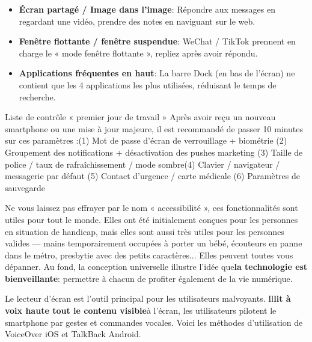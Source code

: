 \begin{itemize}
  \item \textbf{Écran partagé / Image dans l'image}: Répondre aux messages en regardant une vidéo, prendre des notes en naviguant sur le web.
  \item \textbf{Fenêtre flottante / fenêtre suspendue}: WeChat / TikTok prennent en charge le « mode fenêtre flottante », repliez après avoir répondu.
  \item \textbf{Applications fréquentes en haut}: La barre Dock (en bas de l'écran) ne contient que les 4 applications les plus utilisées, réduisant le temps de recherche.
\end{itemize}

\begin{tcbinfo}{Liste de contrôle « premier jour de travail »}
Après avoir reçu un nouveau smartphone ou une mise à jour majeure, il est recommandé de passer 10 minutes sur ces paramètres :\newline (1) Mot de passe d'écran de verrouillage + biométrie (2) Groupement des notifications + désactivation des pushes marketing (3) Taille de police / taux de rafraîchissement / mode sombre\newline (4) Clavier / navigateur / messagerie par défaut (5) Contact d'urgence / carte médicale (6) Paramètres de sauvegarde

\end{tcbinfo}


Ne vous laissez pas effrayer par le nom « accessibilité », ces fonctionnalités sont utiles pour tout le monde. Elles ont été initialement conçues pour les personnes en situation de handicap, mais elles sont aussi très utiles pour les personnes valides — mains temporairement occupées à porter un bébé, écouteurs en panne dans le métro, presbytie avec des petits caractères... Elles peuvent toutes vous dépanner. Au fond, la conception universelle illustre l'idée que\textbf{la technologie est bienveillante}: permettre à chacun de profiter également de la vie numérique.


Le lecteur d'écran est l'outil principal pour les utilisateurs malvoyants. Il\textbf{lit à voix haute tout le contenu visible}à l'écran, les utilisateurs pilotent le smartphone par gestes et commandes vocales. Voici les méthodes d'utilisation de VoiceOver iOS et TalkBack Android.

